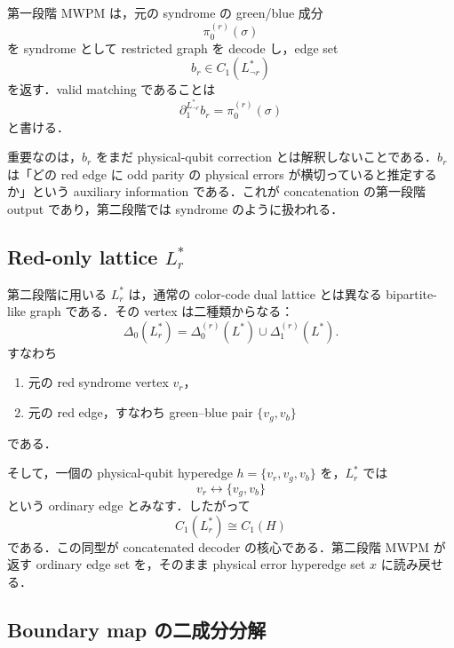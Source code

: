 \documentclass[a4paper,11pt]{ltjsarticle}
\newcommand{\D}{\Delta}
\newcommand{\bd}{\partial}
\begin{document}
第一段階 MWPM は，元の syndrome の green/blue 成分
\begin{equation}
  \pi_0^{(r)}(\sigma)
\end{equation}
を syndrome として restricted graph を decode し，edge set
\begin{equation}
  b_r\in C_1(L^*_{\neg r})
\end{equation}
を返す．valid matching であることは
\begin{equation}
  \bd_1^{L^*_{\neg r}}b_r=\pi_0^{(r)}(\sigma)
  \label{eq:first-matching}
\end{equation}
と書ける．

重要なのは，$b_r$ をまだ physical-qubit correction とは解釈しないことである．$b_r$ は「どの red edge に odd parity の physical errors が横切っていると推定するか」という auxiliary information である．これが concatenation の第一段階 output であり，第二段階では syndrome のように扱われる．

\subsection{Red-only lattice $L^*_r$}

第二段階に用いる $L^*_r$ は，通常の color-code dual lattice とは異なる bipartite-like graph である．その vertex は二種類からなる：
\begin{equation}
  \D_0(L^*_r)=\D_0^{(r)}(L^*)\cup \D_1^{(r)}(L^*).
\end{equation}
すなわち
\begin{enumerate}[label=(\alph*)]
  \item 元の red syndrome vertex $v_r$，
  \item 元の red edge，すなわち green--blue pair $\{v_g,v_b\}$
\end{enumerate}
である．

そして，一個の physical-qubit hyperedge $h=\{v_r,v_g,v_b\}$ を，$L^*_r$ では
\begin{equation}
  v_r \longleftrightarrow \{v_g,v_b\}
  \label{eq:red-only-edge}
\end{equation}
という ordinary edge とみなす．したがって
\begin{equation}
  C_1(L^*_r)\cong C_1(H)
  \label{eq:isomorphism}
\end{equation}
である．この同型が concatenated decoder の核心である．第二段階 MWPM が返す ordinary edge set を，そのまま physical error hyperedge set $x$ に読み戻せる．

\subsection{Boundary map の二成分分解}
\end{document}
